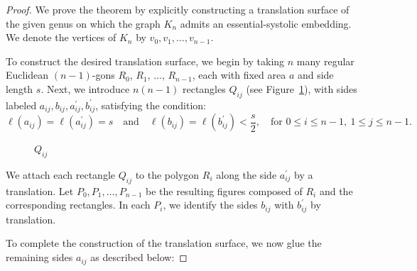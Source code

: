 \documentclass[11pt]{amsart}
\theoremstyle{plain}
\theoremstyle{definition}
\theoremstyle{remark}
\numberwithin{equation}{section}
\numberwithin{figure}{section}
\begin{document}
\begin{proof}
We prove the theorem by explicitly constructing a translation surface of the given genus on which the graph $K_n$ admits an essential-systolic embedding. We denote the vertices of $K_n$ by $v_0, v_1, \dots, v_{n-1}$.

To construct the desired translation surface, we begin by taking $n$ many regular Euclidean $(n-1)$-gons $R_0$, $R_1$, $\dots$, $R_{n-1}$, each with fixed area $a$ and side length $s$. Next, we introduce $n(n-1)$ rectangles $Q_{ij}$ (see Figure~\ref{Qij}), with sides labeled $a_{ij}, b_{ij}, a_{ij}^\prime, b_{ij}^\prime$, satisfying the condition:
\begin{equation}\label{eq:1}
    \ell(a_{ij}) = \ell(a_{ij}^\prime) = s \quad \text{and} \quad \ell(b_{ij}) = \ell(b_{ij}^\prime) < \frac{s}{2}, \quad \text{for } 0 \leq i \leq n-1,\ 1 \leq j \leq n-1.
\end{equation}

\begin{figure}[htbp]
\begin{center}
\end{center}
\caption{$Q_{ij}$ }
\label{Qij}
\end{figure}

We attach each rectangle $Q_{ij}$ to the polygon $R_i$ along the side $a_{ij}^\prime$ by a translation. Let $P_0, P_1, \dots, P_{n-1}$ be the resulting figures composed of $R_i$ and the corresponding rectangles. In each $P_i$, we identify the sides $b_{ij}$ with $b_{ij}^\prime$ by translation.

To complete the construction of the translation surface, we now glue the remaining sides $a_{ij}$ as described below:


\end{proof}
\end{document}
